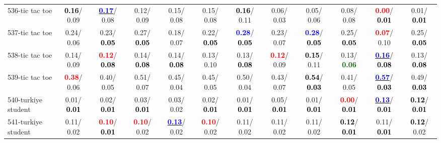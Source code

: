 \begin{table}[h]
\begin{center}
{\begin{tabular}{lc|c|c|c|c|c|c|c|c|c|c}
536-tic tac toe & \textcolor{black}{\textbf{  0.16}}/  0.09 & \underline{\textcolor{blue}{\textbf{  0.17}}}/  0.08 &   0.12/  0.09 &   0.15/  0.08 &   0.15/  0.08 & \textcolor{black}{\textbf{  0.16}}/  0.11 &   0.06/  0.03 &   0.05/  0.06 &   0.08/  0.08 & \textcolor{red}{\textbf{  0.00}}/\textcolor{black}{\textbf{  0.01}} &   0.01/\textcolor{black}{\textbf{  0.01}} \\
537-tic tac toe &   0.24/  0.06 &   0.23/\textcolor{black}{\textbf{  0.05}} &   0.27/\textcolor{black}{\textbf{  0.05}} &   0.18/  0.07 &   0.22/\textcolor{black}{\textbf{  0.05}} & \textcolor{blue}{\textbf{  0.28}}/\textcolor{black}{\textbf{  0.05}} &   0.23/  0.07 & \textcolor{blue}{\textbf{  0.28}}/\textcolor{black}{\textbf{  0.05}} &   0.25/\textcolor{black}{\textbf{  0.05}} & \textcolor{red}{\textbf{  0.07}}/  0.10 &   0.25/\textcolor{black}{\textbf{  0.05}} \\
538-tic tac toe &   0.14/  0.09 & \textcolor{red}{\textbf{  0.12}}/\textcolor{black}{\textbf{  0.08}} &   0.14/\textcolor{black}{\textbf{  0.08}} &   0.14/\textcolor{black}{\textbf{  0.08}} &   0.13/  0.10 &   0.13/\textcolor{black}{\textbf{  0.08}} & \textcolor{red}{\textbf{  0.12}}/  0.09 & \textcolor{black}{\textbf{  0.15}}/  0.11 &   0.13/\textcolor{darkgreen}{\textbf{  0.06}} & \underline{\textcolor{blue}{\textbf{  0.16}}}/\textcolor{black}{\textbf{  0.08}} &   0.13/\textcolor{black}{\textbf{  0.08}} \\
539-tic tac toe & \textcolor{red}{\textbf{  0.38}}/  0.06 &   0.40/  0.05 &   0.51/  0.07 &   0.45/  0.04 &   0.45/  0.05 &   0.50/  0.04 &   0.43/  0.07 & \textcolor{black}{\textbf{  0.54}}/\textcolor{black}{\textbf{  0.03}} &   0.41/  0.05 & \underline{\textcolor{blue}{\textbf{  0.57}}}/\textcolor{black}{\textbf{  0.03}} &   0.49/\textcolor{black}{\textbf{  0.03}} \\
540-turkiye student &   0.01/\textcolor{black}{\textbf{  0.01}} &   0.02/\textcolor{black}{\textbf{  0.01}} &   0.03/\textcolor{black}{\textbf{  0.01}} &   0.03/  0.02 &   0.02/\textcolor{black}{\textbf{  0.01}} &   0.01/\textcolor{black}{\textbf{  0.01}} &   0.05/\textcolor{black}{\textbf{  0.01}} &   0.01/\textcolor{black}{\textbf{  0.01}} & \textcolor{red}{\textbf{  0.00}}/\textcolor{black}{\textbf{  0.01}} & \underline{\textcolor{blue}{\textbf{  0.13}}}/\textcolor{black}{\textbf{  0.01}} & \textcolor{black}{\textbf{  0.12}}/\textcolor{black}{\textbf{  0.01}} \\ \hline
541-turkiye student &   0.11/  0.02 & \textcolor{red}{\textbf{  0.10}}/\textcolor{black}{\textbf{  0.01}} & \textcolor{red}{\textbf{  0.10}}/  0.02 & \underline{\textcolor{blue}{\textbf{  0.13}}}/  0.02 & \textcolor{red}{\textbf{  0.10}}/  0.02 &   0.11/  0.02 &   0.11/  0.02 &   0.11/  0.02 & \textcolor{black}{\textbf{  0.12}}/\textcolor{black}{\textbf{  0.01}} &   0.11/\textcolor{black}{\textbf{  0.01}} & \textcolor{black}{\textbf{  0.12}}/  0.02 \\

\end{tabular}}
\end{center}
\end{table}
